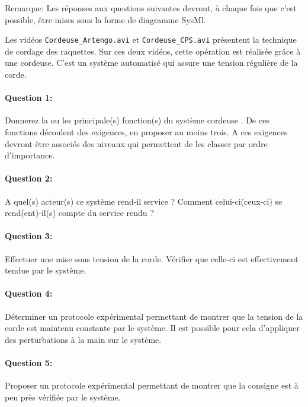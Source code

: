 


Remarque: Les réponses aux questions suivantes devront, à chaque fois que c'est possible, être mises sous la forme de diagramme SysMl.


Les vidéos \texttt{Cordeuse\_Artengo.avi} et \texttt{Cordeuse\_CPS.avi} présentent la technique de cordage des raquettes. Sur ces deux vidéos, cette opération est réalisée grâce à une cordeuse. C'est un système automatisé qui assure une tension régulière de la corde.

\paragraph{Question 1:} Donnerez la ou les principale(s) fonction(s) du système \og cordeuse \fg. De ces fonctions découlent des exigences, en proposer au moins trois. A ces exigences devront être associés des niveaux qui permettent de les classer par ordre d'importance.

\paragraph{Question 2:} A quel(s) acteur(s) ce système rend-il service ? Comment celui-ci(ceux-ci) se rend(ent)-il(s) compte du service rendu ?


\paragraph{Question 3:} Effectuer une mise sous tension de la corde. Vérifier que celle-ci est effectivement tendue par le système.

\paragraph{Question 4:} Déterminer un protocole expérimental permettant de montrer que la tension de la corde est maintenu constante par le système. Il est possible pour cela d'appliquer des perturbations à la main sur le système.

\paragraph{Question 5:} Proposer un protocole expérimental permettant de montrer que la consigne est à peu près vérifiée par le système.

